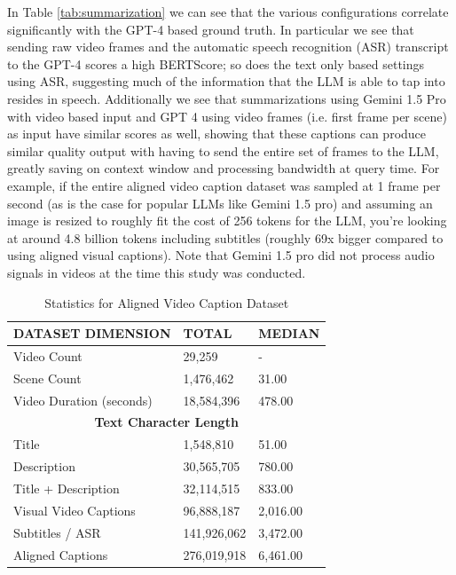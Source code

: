 \documentclass[sigconf]{acmart}
\begin{document}
\begin{CCSXML}
		In Table \ref{tab:summarization} we can see that the various configurations correlate significantly with the GPT-4 based ground truth. In particular we see that sending raw video frames and the automatic speech recognition (ASR) transcript to the GPT-4 scores a high BERTScore; so does the text only based settings using ASR, suggesting much of the information that the LLM is able to tap into resides in speech. Additionally we see that summarizations using Gemini 1.5 Pro with video based input and GPT 4 using video frames (i.e. first frame per scene) as input have similar scores as well, showing that these captions can produce similar quality output with having to send the entire set of frames to the LLM, greatly saving on context window and processing bandwidth at query time. For example, if the entire aligned video caption dataset was sampled at 1 frame per second (as is the case for popular LLMs like Gemini 1.5 pro) and assuming an image is resized to roughly fit the cost of 256 tokens for the LLM, you're looking at around 4.8 billion tokens including subtitles (roughly 69x bigger compared to using aligned visual captions). Note that Gemini 1.5 pro did not process audio signals in videos at the time this study was conducted.
		
		\begin{table}[h]
			\centering
			\begin{tabular}{l l l }
				\toprule
				\textbf{DATASET DIMENSION} & \textbf{TOTAL} & \textbf{MEDIAN} \\ \hline
				Video Count & 29,259 & - \\
				Scene Count & 1,476,462 & 31.00 \\
				Video Duration (seconds) & 18,584,396 & 478.00 \\
				\midrule		
				\multicolumn{3}{c}{\textbf{Text Character Length}} \\
				\midrule
				Title & 1,548,810 & 51.00 \\
				Description & 30,565,705 & 780.00 \\
				Title + Description & 32,114,515 & 833.00 \\
				Visual Video Captions & 96,888,187 & 2,016.00 \\
				Subtitles / ASR & 141,926,062 & 3,472.00 \\
				Aligned Captions & 276,019,918 & 6,461.00 \\
				\bottomrule
			\end{tabular}
			\caption{Statistics for Aligned Video Caption Dataset}
			\label{tab:dataset}
		\end{table}
		

\end{CCSXML}
\end{document}
